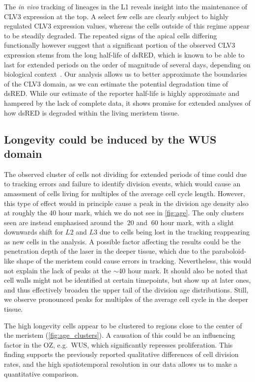 The \textit{in vivo} tracking of lineages in the L1 reveals insight into the
maintenance of CLV3 expression at the top. A select few cells are clearly
subject to highly regulated CLV3 expression values, whereas the cells outside of
this regime appear to be steadily degraded. The repeated signs of the apical
cells differing functionally however suggest that
a significant portion of the observed CLV3 expression stems from the
long half-life of dsRED, which is known to be able to last for extended periods
on the order of magnitude of several days, depending on biological
context~\cite{filonov2011bright}. Our analysis allows us to better  
approximate the boundaries of the CLV3 domain, as we can
estimate the potential degradation time of dsRED.  
While our estimate of the reporter half-life is highly approximate and hampered by
the lack of complete data, it shows promise for extended analyses of how dsRED
is degraded within the living meristem tissue. 


\subsection{Longevity could be induced by the WUS domain}
The observed cluster of cells not dividing for extended periods of time could
due to tracking errors and failure to identify division events,
which would cause an amassment of cells living for multiples of the average cell
cycle length. However, this type of effect would in principle cause a peak in
the division age density also at roughly the 40 hour mark, which we do not see
in \cref{fig:age}. The only clusters seen are instead emphasised around the
$~20$ and $~60$ hour mark, with a slight downwards shift for $L2$ and $L3$ due
to cells being lost in the tracking reappearing as new cells in the analysis. 
A possible factor affecting the results could be the penetration depth of the
laser in the deeper tissue, which due to the paraboloid-like shape of the
meristem could cause errors in tracking. Nevertheless, this would not explain
the lack of peaks at the $\sim$40 hour mark. It should also be noted that cell
walls might not be identified at certain timepoints, but show up at later ones,
and thus effectively broaden the upper tail of the division age distributions.
Still, we observe pronounced peaks for multiples of the average cell cycle in
the deeper tissue.  

The high longevity cells appear to be clustered to regions close to the
center of the meristem (\cref{fig:age_clusters}). A causation of this
could be an influencing factor in the OZ, e.g.\ WUS, which significantly
represses proliferation. This finding supports the previously reported
qualitative differences of cell division rates, and the high spatiotemporal
resolution in our data allows us to make a quantitative comparison.   

